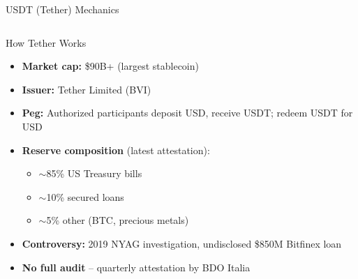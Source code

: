 \documentclass[8pt,aspectratio=169]{beamer}
\begin{document}
\begin{frame}{USDT (Tether) Mechanics}
\begin{columns}[T]
\begin{block}{How Tether Works}
\footnotesize
\begin{itemize}
  \item \textbf{Market cap:} \$90B+ (largest stablecoin)
  \item \textbf{Issuer:} Tether Limited (BVI)
  \item \textbf{Peg:} Authorized participants deposit USD, receive USDT; redeem USDT for USD
  \item \textbf{Reserve composition} (latest attestation):
    \begin{itemize}\scriptsize
      \item $\sim$85\% US Treasury bills
      \item $\sim$10\% secured loans
      \item $\sim$5\% other (BTC, precious metals)
    \end{itemize}
  \item \textbf{Controversy:} 2019 NYAG investigation, undisclosed \$850M Bitfinex loan
  \item \textbf{No full audit} -- quarterly attestation by BDO Italia
\end{itemize}
\end{block}


\end{columns}
\end{frame}
\end{document}
